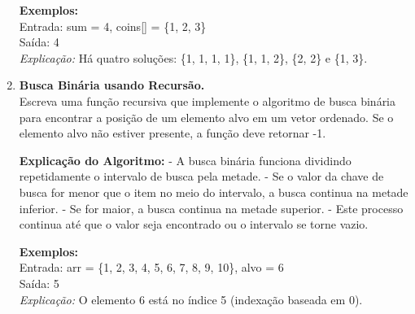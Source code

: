 \documentclass[12pt]{article}
\begin{document}
\begin{enumerate}
    \textbf{Exemplos:} \\
    Entrada: sum = 4, coins[] = \{1, 2, 3\} \\
    Saída: 4 \\
    \textit{Explicação:} Há quatro soluções: \{1, 1, 1, 1\}, \{1, 1, 2\}, \{2, 2\} e \{1, 3\}.
    
    \item \textbf{Busca Binária usando Recursão.} \\
    Escreva uma função recursiva que implemente o algoritmo de busca binária para encontrar a posição de um elemento alvo em um vetor ordenado. Se o elemento alvo não estiver presente, a função deve retornar -1. 
    
    \textbf{Explicação do Algoritmo:} 
    - A busca binária funciona dividindo repetidamente o intervalo de busca pela metade. 
    - Se o valor da chave de busca for menor que o item no meio do intervalo, a busca continua na metade inferior. 
    - Se for maior, a busca continua na metade superior. 
    - Este processo continua até que o valor seja encontrado ou o intervalo se torne vazio.

    \textbf{Exemplos:} \\
    Entrada: arr = \{1, 2, 3, 4, 5, 6, 7, 8, 9, 10\}, alvo = 6 \\
    Saída: 5 \\
    \textit{Explicação:} O elemento 6 está no índice 5 (indexação baseada em 0).

\end{enumerate}
\end{document}
